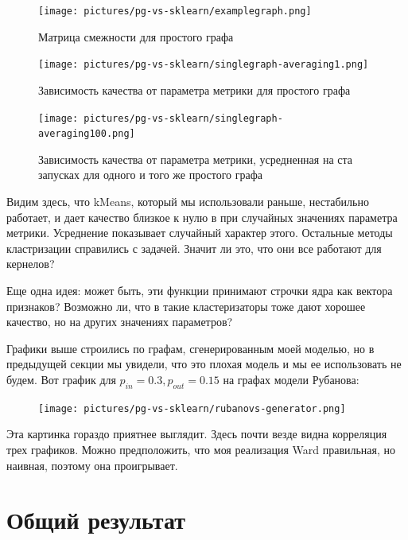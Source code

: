 \documentclass{article}
\begin{document}
\begin{figure}[H]
	\texttt{[image: pictures/pg-vs-sklearn/examplegraph.png]}
	\caption{\label{f_vs2} Матрица смежности для простого графа}
\end{figure}

\begin{figure}[H]
	\texttt{[image: pictures/pg-vs-sklearn/singlegraph-averaging1.png]}
	\caption{\label{f_vs2} Зависимость качества от параметра метрики для простого графа}
\end{figure}

\begin{figure}[H]
	\texttt{[image: pictures/pg-vs-sklearn/singlegraph-averaging100.png]}
	\caption{\label{f_vs2} Зависимость качества от параметра метрики, усредненная на ста запусках для одного и того же простого графа}
\end{figure}

Видим здесь, что kMeans, который мы использовали раньше, нестабильно работает, и дает качество близкое к нулю в при случайных значениях параметра метрики. Усреднение показывает случайный характер этого. Остальные методы кластризации справились с задачей. Значит ли это, что они все работают для кернелов?

Еще одна идея: может быть, эти функции принимают строчки ядра как вектора признаков? Возможно ли, что в такие кластеризаторы тоже дают хорошее качество, но на других значениях параметров?

Графики выше строились по графам, сгенерированным моей моделью, но в предыдущей секции мы увидели, что это плохая модель и мы ее использовать не будем. Вот график для $p_{in} = 0.3, p_{out} = 0.15$ на графах модели Рубанова:


\begin{figure}[H]
	\texttt{[image: pictures/pg-vs-sklearn/rubanovs-generator.png]}
	\caption{\label{f_vs2}}
\end{figure}

Эта картинка гораздо приятнее выглядит. Здесь почти везде видна корреляция трех графиков. Можно предположить, что моя реализация Ward правильная, но наивная, поэтому она проигрывает.


\section*{Общий результат}
\end{document}
